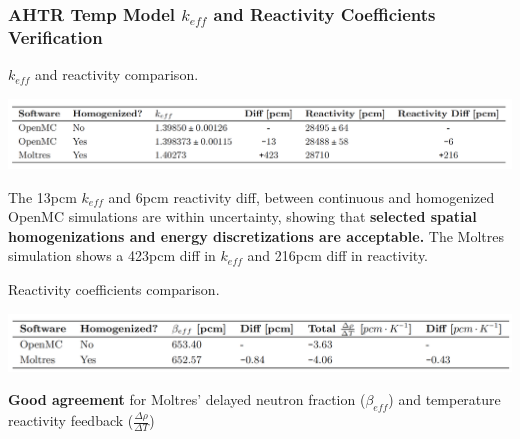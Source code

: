 \begin{frame}
    \frametitle{AHTR Temp Model $k_{eff}$ and Reactivity Coefficients Verification}
        \begin{table}
            \caption{$k_{eff}$ and reactivity comparison.}
            \vspace{-0.2cm}
            \includegraphics[width=0.9\linewidth]{figures/benchmark-keff.png}
        \end{table}
        The 13pcm $k_{eff}$ and 6pcm reactivity diff, between
        continuous and homogenized OpenMC simulations are within uncertainty, showing 
        that \textbf{selected spatial homogenizations and energy discretizations are 
        acceptable.}
        The Moltres simulation shows a 423pcm diff in $k_{eff}$ and 216pcm 
        diff in reactivity.
        \begin{table}
            \caption{Reactivity coefficients comparison.}
            \includegraphics[width=0.85\linewidth]{figures/benchmark-coeff.png}
        \end{table}
        \textbf{Good agreement} for Moltres' delayed neutron fraction ($\beta_{eff}$) and 
        temperature reactivity feedback ($\frac{\Delta \rho}{\Delta T}$)
\end{frame}

